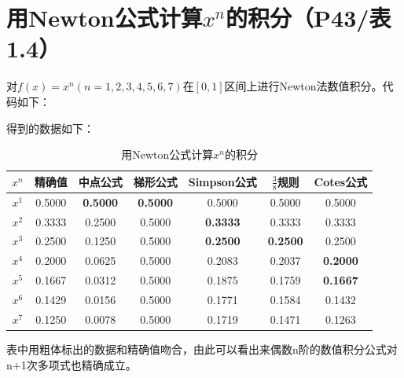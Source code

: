 \documentclass{homework}
\begin{document}
\section{用Newton公式计算$x^n$的积分（P43/表1.4）}
对$f(x)=x^n (n=1,2,3,4,5,6,7)$在$[0,1]$区间上进行Newton法数值积分。代码如下：

得到的数据如下：
\begin{table}[H]
\caption{用Newton公式计算$x^n$的积分}
\centering
\begin{tabular}{|c|c|c|c|c|c|c|}
\hline
$x^n$ & 精确值 & 中点公式 & 梯形公式 & Simpson公式 & $\frac{3}{8}$规则 & Cotes公式 \\\hline
$x^1$ & 0.5000 & {\bf 0.5000} & {\bf 0.5000} & 0.5000 & 0.5000 & 0.5000 \\\hline
$x^2$ & 0.3333 & 0.2500 & 0.5000 & {\bf 0.3333} & 0.3333 & 0.3333 \\\hline
$x^3$ & 0.2500 & 0.1250 & 0.5000 & {\bf 0.2500} & {\bf 0.2500} & 0.2500 \\\hline
$x^4$ & 0.2000 & 0.0625 & 0.5000 & 0.2083 & 0.2037 & {\bf 0.2000} \\\hline
$x^5$ & 0.1667 & 0.0312 & 0.5000 & 0.1875 & 0.1759 & {\bf 0.1667} \\\hline
$x^6$ & 0.1429 & 0.0156 & 0.5000 & 0.1771 & 0.1584 & 0.1432 \\\hline
$x^7$ & 0.1250 & 0.0078 & 0.5000 & 0.1719 & 0.1471 & 0.1263 \\\hline
\end{tabular}
\end{table}
表中用粗体标出的数据和精确值吻合，由此可以看出来偶数n阶的数值积分公式对n+1次多项式也精确成立。
\end{document}
